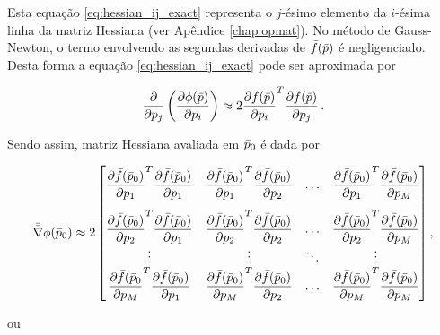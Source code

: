 \indent Esta equação \ref{eq:hessian_ij_exact} representa o $j$-ésimo elemento
da $i$-ésima linha da matriz Hessiana (ver Apêndice \ref{chap:opmat}).
No método de Gauss-Newton, o termo envolvendo as segundas derivadas de
$\bar{f}(\bar{p})$ é negligenciado.
Desta forma a equação \ref{eq:hessian_ij_exact} pode ser aproximada por

\begin{equation}
\dfrac{\partial}{\partial p_j}\left(\dfrac{\partial \phi(\bar{p})}{\partial p_i}\right)
\approx 2 \dfrac{\partial\bar{f}(\bar{p})}{\partial p_i}^T
    \dfrac{\partial\bar{f}(\bar{p})}{\partial p_j} \thinspace .
\label{eq:hessian_ij_approx}
\end{equation}

\noindent Sendo assim, matriz Hessiana avaliada em $\bar{p}_0$ é dada por

\begin{equation*}
\mat{\nabla}\phi(\vect{p}_0) \approx
    2
    \begin{bmatrix}
    \dfrac{\partial\vect{f}(\vect{p}_0)}{\partial p_1}^T\dfrac{\partial\vect{f}(\vect{p}_0)}{\partial p_1} &
    \dfrac{\partial\vect{f}(\vect{p}_0)}{\partial p_1}^T\dfrac{\partial\vect{f}(\vect{p}_0)}{\partial p_2} &
    \ldots &
    \dfrac{\partial\vect{f}(\vect{p}_0)}{\partial p_1}^T\dfrac{\partial\vect{f}(\vect{p}_0)}{\partial p_M}
    \vspace{0.3cm}\\
    \dfrac{\partial\vect{f}(\vect{p}_0)}{\partial p_2}^T\dfrac{\partial\vect{f}(\vect{p}_0)}{\partial p_1} &
    \dfrac{\partial\vect{f}(\vect{p}_0)}{\partial p_2}^T\dfrac{\partial\vect{f}(\vect{p}_0)}{\partial p_2} &
    \ldots &
    \dfrac{\partial\vect{f}(\vect{p}_0)}{\partial p_2}^T\dfrac{\partial\vect{f}(\vect{p}_0)}{\partial p_M}
    \\
    \vdots & \vdots & \ddots & \vdots
    \\
    \dfrac{\partial\vect{f}(\vect{p}_0}{\partial p_M}^T\dfrac{\partial\vect{f}(\vect{p}_0)}{\partial p_1} &
    \dfrac{\partial\vect{f}(\vect{p}_0)}{\partial p_M}^T\dfrac{\partial\vect{f}(\vect{p}_0)}{\partial p_2} &
    \ldots &
    \dfrac{\partial\vect{f}(\vect{p}_0)}{\partial p_M}^T\dfrac{\partial\vect{f}(\vect{p}_0)}{\partial p_M}
    \end{bmatrix} ,
\end{equation*}

\noindent ou

